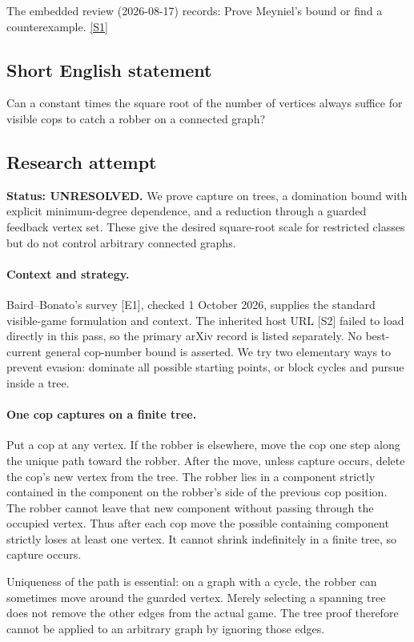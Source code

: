 \documentclass[11pt,a4paper]{article}
\newcommand{\sref}[2]{\hyperlink{source:#1:#2}{[S#2]}}
\begin{document}
The embedded review (2026-08-17) records: Prove Meyniel's bound or find a counterexample. \sref{statement}{1}

\subsection{Short English statement}

Can a constant times the square root of the number of vertices always suffice for visible cops to catch a robber on a connected graph?

\subsection{Research attempt}
\textbf{Status: UNRESOLVED.} We prove capture on trees, a domination bound with explicit minimum-degree dependence, and a reduction through a guarded feedback vertex set. These give the desired square-root scale for restricted classes but do not control arbitrary connected graphs.

\paragraph{Context and strategy.}
Baird--Bonato's survey [E1], checked 1 October 2026, supplies the standard visible-game formulation and context. The inherited host URL [S2] failed to load directly in this pass, so the primary arXiv record is listed separately. No best-current general cop-number bound is asserted. We try two elementary ways to prevent evasion: dominate all possible starting points, or block cycles and pursue inside a tree.

\paragraph{One cop captures on a finite tree.}
Put a cop at any vertex. If the robber is elsewhere, move the cop one step along the unique path toward the robber. After the move, unless capture occurs, delete the cop's new vertex from the tree. The robber lies in a component strictly contained in the component on the robber's side of the previous cop position. The robber cannot leave that new component without passing through the occupied vertex. Thus after each cop move the possible containing component strictly loses at least one vertex. It cannot shrink indefinitely in a finite tree, so capture occurs.

Uniqueness of the path is essential: on a graph with a cycle, the robber can sometimes move around the guarded vertex. Merely selecting a spanning tree does not remove the other edges from the actual game. The tree proof therefore cannot be applied to an arbitrary graph by ignoring those edges.
\end{document}
